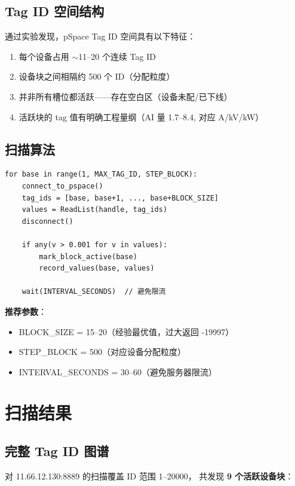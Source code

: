 \documentclass[12pt,a4paper]{ctexart}
\begin{document}
\subsection{Tag ID 空间结构}
通过实验发现，pSpace Tag ID 空间具有以下特征：
\begin{enumerate}[leftmargin=*]
  \item 每个设备占用 $\sim$11--20 个连续 Tag ID
  \item 设备块之间相隔约 500 个 ID（分配粒度）
  \item 并非所有槽位都活跃——存在空白区（设备未配/已下线）
  \item 活跃块的 tag 值有明确工程量纲（AI 量 1.7--8.4, 对应 A/kV/kW）
\end{enumerate}

\subsection{扫描算法}
\begin{lstlisting}
for base in range(1, MAX_TAG_ID, STEP_BLOCK):
    connect_to_pspace()
    tag_ids = [base, base+1, ..., base+BLOCK_SIZE]
    values = ReadList(handle, tag_ids)
    disconnect()

    if any(v > 0.001 for v in values):
        mark_block_active(base)
        record_values(base, values)

    wait(INTERVAL_SECONDS)  // 避免限流
\end{lstlisting}

\textbf{推荐参数}：
\begin{itemize}[leftmargin=*]
  \item BLOCK\_SIZE = 15--20（经验最优值，过大返回 -19997）
  \item STEP\_BLOCK = 500（对应设备分配粒度）
  \item INTERVAL\_SECONDS = 30--60（避免服务器限流）
\end{itemize}

\section{扫描结果}

\subsection{完整 Tag ID 图谱}

对 11.66.12.130:8889 的扫描覆盖 ID 范围 1--20000，
共发现 \textbf{9 个活跃设备块}：
\end{document}
